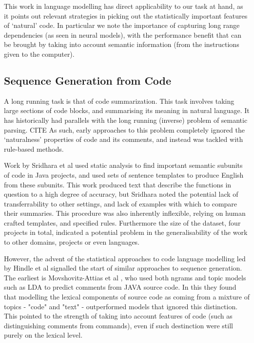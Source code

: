 This work in language modelling has direct applicability to our task at hand, as it points out relevant strategies in picking out the statistically important features of `natural' code. In particular we note the importance of capturing long range dependencies (as seen in neural models), with the performance benefit that can be brought by taking into account semantic information (from the instructions given to the computer).

\subsection{Sequence Generation from Code}

A long running task is that of code summarization. 
This task involves taking large sections of code blocks, and summarising its meaning in natural language. It has historically had parallels with the long running (inverse) problem of semantic parsing. CITE
As such, early approaches to this problem completely ignored the `naturalness' properties of code and its comments, and instead was tackled with rule-based methods. 

Work by Sridhara et al \cite{sridhara_[not_2010}  used static analysis to find important semantic subunits of code in Java projects, and used sets of sentence templates to produce English from these subunits.
This work produced text that describe the functions in question to a high degree of accuracy, but Sridhara noted the potential lack of transferrability to other settings, and lack of examples with which to compare their summaries.  
This procedure was also inherently inflexible, relying on human crafted templates, and specified rules. Furthermore the size of the dataset, four projects in total, indicated a potential problem in the generalisability of the work to other domains, projects or even languages.

However, the advent of the statistical approaches to code language modelling led by Hindle et al \cite{hindle_naturalness_nodate} signalled the start of similar approaches to sequence generation. The earliest is Movshovitz-Attias et al \cite{movshovitz-attias_natural_nodate}, who used both ngrams and topic models such as LDA to predict comments from JAVA source code. In this they found that modelling the lexical components of source code as coming from a mixture of topics - "code" and "text" - outperformed models that ignored this distinction.  This pointed to the strength of taking into account features of code (such as distinguishing comments from commands), even if such destinction were still purely on the lexical level.

